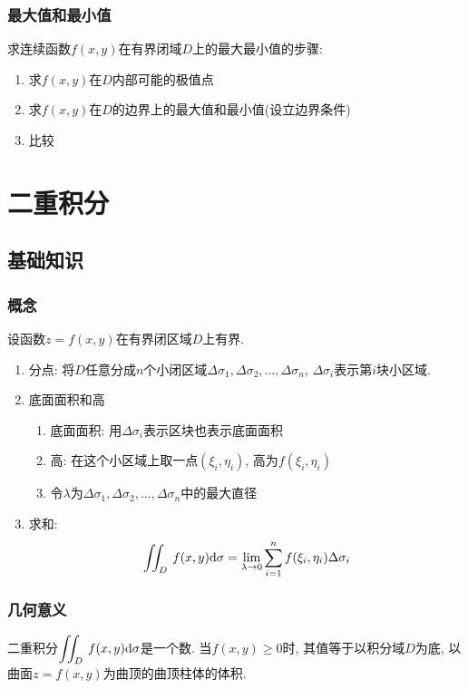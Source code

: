\subsection{最大值和最小值}
求连续函数$ f(x,y) $在有界闭域$ D $上的最大最小值的步骤:
\begin{enumerate}
\item 求$ f(x,y) $在$ D $内部可能的极值点
\item 求$ f(x,y) $在$ D $的边界上的最大值和最小值(设立边界条件)
\item 比较
\end{enumerate}
\chapter{二重积分}
\section{基础知识}
\subsection{概念}
设函数$ z=f(x,y) $在有界闭区域$ D $上有界.
\begin{enumerate}
\item 分点: 将$ D $任意分成$ n $个小闭区域$ \Delta \sigma_{1}, \Delta \sigma_{2},...,\Delta \sigma_{n} $, $ \Delta \sigma_{i} $表示第$ i $块小区域.
\item 底面面积和高
\begin{enumerate}
\item 底面面积: 用$ \Delta\sigma_{i} $表示区块也表示底面面积
\item 高: 在这个小区域上取一点$ (\xi_{i},\eta_{i}) $, 高为$ f(\xi_{i},\eta_{i}) $
\item 令$ \lambda $为$ \Delta \sigma_{1}, \Delta \sigma_{2},...,\Delta \sigma_{n} $中的最大直径
\end{enumerate}
\item 求和:
\begin{equation*}
\displaystyle\iint_{D}^{}\hspace{.2em}f(x,y)\mathrm{d}\sigma=\lim\limits_{\lambda \rightarrow 0}\sum_{i=1}^{n}f(\xi_{i},\eta_{i})\Delta \sigma_{i}
\end{equation*}
\end{enumerate}
\subsection{几何意义}
二重积分$ \displaystyle\iint_{D}^{}\hspace{.2em}f(x,y)\mathrm{d}\sigma $是一个数. 当$ f(x,y)\ge 0 $时, 其值等于以积分域$ D $为底, 以曲面$ z=f(x,y) $为曲顶的曲顶柱体的体积.
